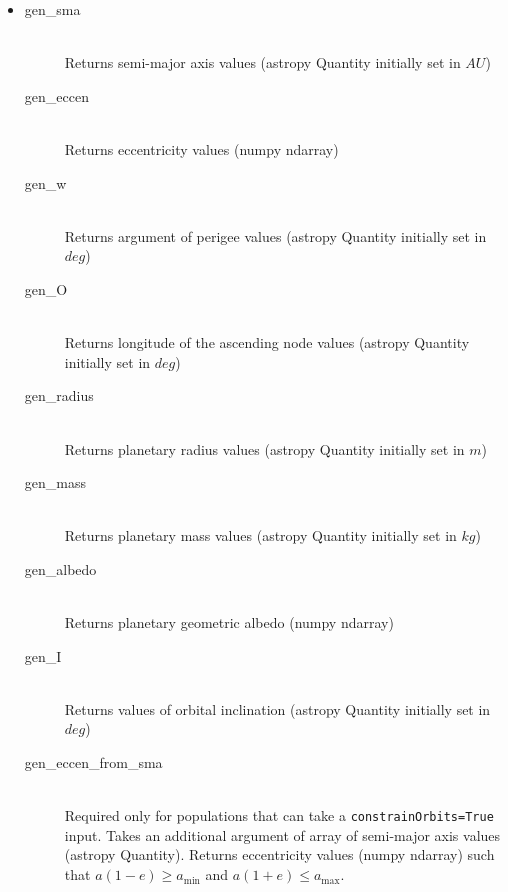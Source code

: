\documentclass[cleanfoot]{asme2ej}
\begin{document}
\begin{itemize}
    \item 
    \begin{description}
        \item[gen\_sma] \hfill \\
        Returns semi-major axis values (astropy Quantity initially set in $ AU $)
        \item[gen\_eccen] \hfill \\
        Returns eccentricity values (numpy ndarray)
        \item[gen\_w] \hfill \\
        Returns argument of perigee values (astropy Quantity initially set in $ deg $)
        \item[gen\_O] \hfill \\
        Returns longitude of the ascending node values (astropy Quantity initially set in $ deg $)
        \item[gen\_radius] \hfill \\
        Returns planetary radius values  (astropy Quantity initially set in $ m $)
        \item[gen\_mass] \hfill \\
        Returns planetary mass values (astropy Quantity initially set in $ kg $)
        \item[gen\_albedo] \hfill \\
        Returns planetary geometric albedo (numpy ndarray)
        \item[gen\_I] \hfill \\
        Returns values of orbital inclination (astropy Quantity initially set in $ deg $)
        \item[gen\_eccen\_from\_sma] \hfill \\
        Required only for populations that can take a \verb+constrainOrbits=True+ input. Takes an additional argument of array of semi-major axis values (astropy Quantity). Returns eccentricity values (numpy ndarray) such that $a(1-e) \ge  a_\textrm{min}$ and $a(1+e) \le a_\textrm{max}$.
    \end{description}
\end{itemize}

\end{document}
